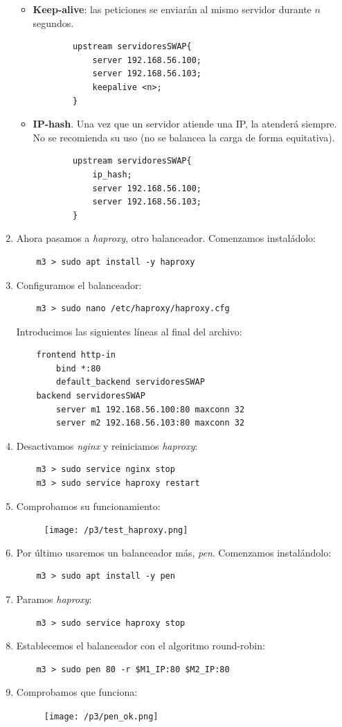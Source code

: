 \documentclass[12pt,spanish]{article}
\begin{document}
\begin{enumerate}
		\begin{itemize}
			\item \textbf{Keep-alive}: las peticiones se enviarán al mismo servidor durante $n$ segundos.
			\begin{lstlisting}
		upstream servidoresSWAP{
			server 192.168.56.100;
			server 192.168.56.103;
			keepalive <n>;
		}
			\end{lstlisting}
			\item \textbf{IP-hash}. Una vez que un servidor atiende una IP, la atenderá siempre. No se recomienda su uso (no se balancea la carga de forma equitativa).
			\begin{lstlisting}
		upstream servidoresSWAP{
			ip_hash;
			server 192.168.56.100;
			server 192.168.56.103;
		}
			\end{lstlisting}
		\end{itemize}
	\item Ahora pasamos a \emph{haproxy}, otro balanceador. Comenzamos instaládolo:
	\begin{lstlisting}
	m3 > sudo apt install -y haproxy
	\end{lstlisting}
	\item Configuramos el balanceador:
	\begin{lstlisting}
	m3 > sudo nano /etc/haproxy/haproxy.cfg
	\end{lstlisting}
	Introducimos las siguientes líneas al final del archivo:
	\begin{lstlisting}
	frontend http-in
		bind *:80
		default_backend servidoresSWAP
	backend servidoresSWAP
		server m1 192.168.56.100:80 maxconn 32
		server m2 192.168.56.103:80 maxconn 32
	\end{lstlisting}
	\item Desactivamos \emph{nginx} y reiniciamos \emph{haproxy}:
	\begin{lstlisting}
	m3 > sudo service nginx stop
	m3 > sudo service haproxy restart
	\end{lstlisting}
	\item Comprobamos su funcionamiento:
	\begin{figure}[H]
		\centering
		\texttt{[image: /p3/test\_haproxy.png]}
	\end{figure}
	\item Por último usaremos un balanceador más, \emph{pen}. Comenzamos instalándolo:
	\begin{lstlisting}
	m3 > sudo apt install -y pen
	\end{lstlisting}
	\item Paramos \emph{haproxy}:
	\begin{lstlisting}
	m3 > sudo service haproxy stop
	\end{lstlisting}
	\item Establecemos el balanceador con el algoritmo round-robin:
	\begin{lstlisting}
	m3 > sudo pen 80 -r $M1_IP:80 $M2_IP:80
	\end{lstlisting}
	\item Comprobamos que funciona:
	\begin{figure}[H]
		\centering
		\texttt{[image: /p3/pen\_ok.png]}
	\end{figure}
\end{enumerate}
\end{document}
